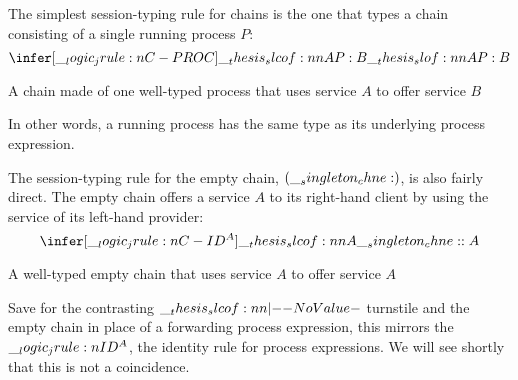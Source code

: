 The simplest session-typing rule for chains is the one that types a chain consisting of a single running process $P$:
\begin{equation*}
  \infer[\jrule{C-PROC}]{\slcof{A |- P : B}}{
    \slof{A |- P : B}}
\end{equation*}
%
\begin{marginfigure}[-3\baselineskip]
  \centering
  \caption{A chain made of one well-typed process that uses service $A$ to offer service $B$}\label{fig:singleton-processes:single-process-chain}
\end{marginfigure}%
%
In other words, a running process has the same type as its underlying process expression.


The session-typing rule for the empty chain, $(\__singleton_chne:)$, is also fairly direct.
The empty chain offers a service $A$ to its right-hand client by using the service of its left-hand provider:
\begin{equation*}
  \infer[\jrule{C-ID}\smash{^A}]{\slcof{A |- \chne : A}}{}
\end{equation*}
%
\begin{marginfigure}
  \centering
  \caption{A well-typed empty chain that uses service $A$ to offer service $A$}\label{fig:singleton-processes:empty-chain}
\end{marginfigure}%
%
Save for the contrasting $\slcof{|-}$ turnstile and the empty chain in place of a forwarding process expression, this mirrors the $\__logic_jrule:n {ID}\smash{^A}$, the identity rule for process expressions.
We will see shortly that this is not a coincidence.

